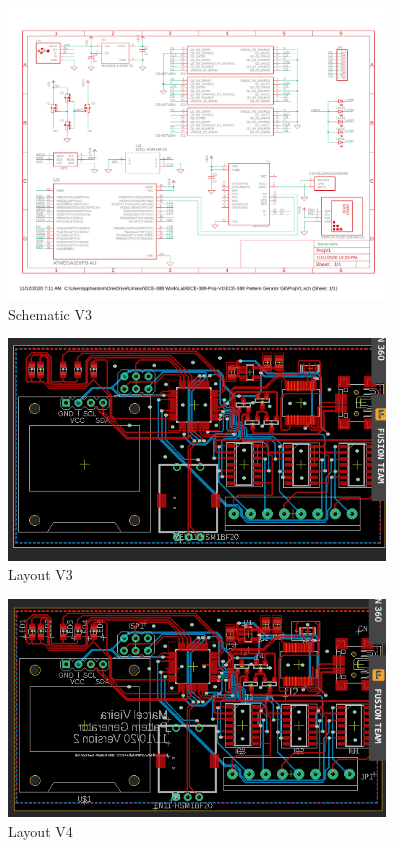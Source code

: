 \documentclass[12pt]{article}
\begin{document}
\begin{figure}[htp]
    \centering
    \includegraphics[width=10cm]{ProjV3.pdf}
    \caption{Schematic V3}
\end{figure}

\begin{figure}[htp]
    \centering
    \includegraphics[width=10cm]{LayoutV3.png}
    \caption{Layout V3}
\end{figure}

\begin{figure}[htp]
    \centering
    \includegraphics[width=10cm]{LayoutV4.png}
    \caption{Layout V4}
\end{figure}
\end{document}
